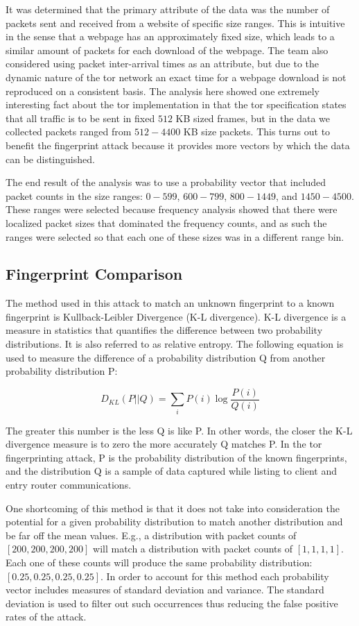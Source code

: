 \documentclass{article}
\begin{document}
It was determined that the primary attribute of the data was the number of 
packets sent and received from a website of specific size ranges. This is 
intuitive in the sense that a webpage has an approximately fixed size, which 
leads to a similar amount of packets for each download of the webpage. The team
also considered using packet inter-arrival times as an attribute, but due to the
dynamic nature of the tor network an exact time for a webpage download is not 
reproduced on a consistent basis. The analysis here showed one extremely
interesting fact about the tor implementation in that the tor specification
states that all traffic is to be sent in fixed $512$ KB sized frames, but 
in the data we collected packets ranged from $512-4400$ KB size packets. This
turns out to benefit the fingerprint attack because it provides more 
vectors by which the data can be distinguished. 

The end result of the analysis was to use a probability vector that included
packet counts in the size ranges: $0-599$, $600-799$, $800-1449$, and 
$1450-4500$. These ranges were selected because frequency analysis
showed that there were localized packet sizes that dominated the frequency counts, 
and as such the ranges were selected so that each one of these sizes was in a
different range bin. 

\subsection{Fingerprint Comparison}
The method used in this attack to match an unknown fingerprint to a known 
fingerprint is Kullback-Leibler Divergence (K-L divergence). K-L divergence 
is a measure in statistics that quantifies the difference between two 
probability distributions. It is also referred to as relative entropy. The 
following equation is used to measure the difference of a probability 
distribution Q from another probability distribution P: 

\[ D_{KL}(P||Q) = \sum_i P(i)\log\frac{P(i)}{Q(i)}\]

The greater this number is the less Q is like P. In other words, the closer 
the K-L divergence measure is to zero the more accurately Q matches P. In the 
tor fingerprinting attack, P is the probability distribution of the known 
fingerprints, and the distribution Q is a sample of data captured while listing 
to client and entry router communications. 

One shortcoming of this method is that it does not take into consideration 
the potential for a given probability distribution to match another 
distribution and be far off the mean values. E.g., a distribution with packet
counts of $[200,200,200,200]$ will match a distribution with packet counts of
$[1,1,1,1]$. Each one of these counts will produce the same probability 
distribution: $[0.25,0.25,0.25,0.25]$. In order to account for this method 
each probability vector includes 
measures of standard deviation and variance. The standard deviation is used 
to filter out such occurrences thus reducing the false positive rates of the attack.
\end{document}
